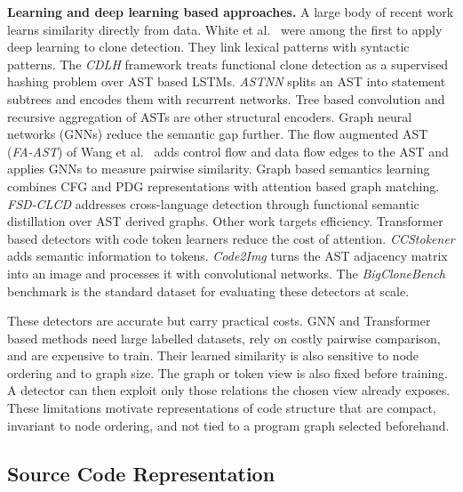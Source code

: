 \documentclass[final,5p,times,twocolumn]{elsarticle}
\newcommand{\added}[1]{{\color{green!50!black}#1}}
\theoremstyle{plain}
\begin{document}
\textbf{Learning and deep learning based approaches.} A large body of
recent work learns similarity directly from data. White et al.\
\cite{white2016deep} were among the first to apply deep learning to clone
detection. They link lexical patterns with syntactic patterns. The
\emph{CDLH} framework \cite{wei2017cdlh} treats functional clone detection
as a supervised hashing problem over AST based LSTMs. \emph{ASTNN}
\cite{zhang2019astnn} splits an AST into statement subtrees and encodes
them with recurrent networks. Tree based convolution
\cite{yu2019neural} and recursive aggregation of ASTs
\cite{buch2019learning} are other structural encoders. Graph neural
networks (GNNs) reduce the semantic gap further. The flow augmented AST
(\emph{FA-AST}) of Wang et al.\ \cite{wang2020faast} adds control flow and
data flow edges to the AST and applies GNNs to measure pairwise
similarity. Graph based semantics learning \cite{yu2023graphsemantics}
combines CFG and PDG representations with attention based graph matching.
\emph{FSD-CLCD} \cite{zhang2024fsdclcd} addresses cross-language detection
through functional semantic distillation over AST derived graphs. Other
work targets efficiency. Transformer based detectors with code token
learners \cite{zhang2023efficient} reduce the cost of attention.
\emph{CCStokener} \cite{wang2023ccstokener} adds semantic information to
tokens. \emph{Code2Img} \cite{hu2023code2img} turns the AST adjacency
matrix into an image and processes it with convolutional networks. The
\emph{BigCloneBench} benchmark \cite{svajlenko2014bigclonebench} is the
standard dataset for evaluating these detectors at scale.

These detectors are accurate but carry practical costs. GNN and Transformer
based methods need large labelled datasets, rely on costly pairwise
comparison, and are expensive to train. Their learned similarity is also
sensitive to node ordering and to graph size. \added{The graph or token view is also fixed
before training. A detector can then exploit only those relations the chosen
view already exposes. These limitations motivate representations of code
structure that are compact, invariant to node ordering, and not tied to a
program graph selected beforehand.}

\subsection{Source Code Representation}
\label{subsec:representation}
\end{document}
